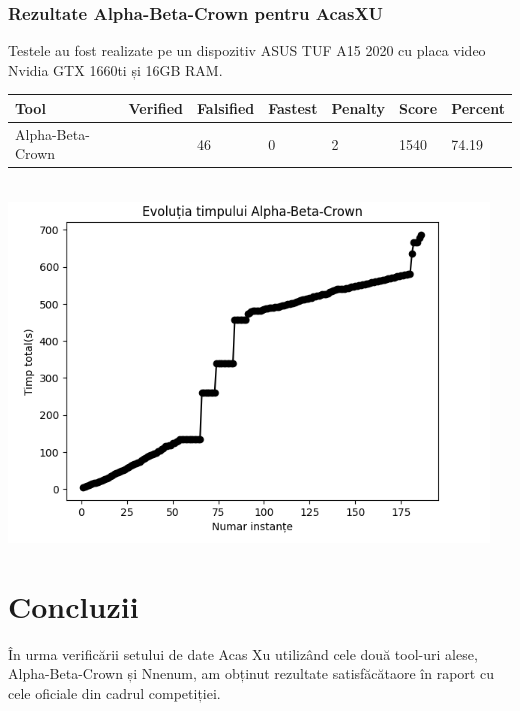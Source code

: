 \documentclass[12pt,a4paper]{article}
\begin{document}
\subsubsection{Rezultate Alpha-Beta-Crown pentru AcasXU}
Testele au fost realizate pe un dispozitiv ASUS TUF A15 2020 cu placa video Nvidia GTX 1660ti  și 16GB RAM.
\\
\begin{tabularx}{1.1\textwidth}{ | >{\centering\arraybackslash}X | >{\centering\arraybackslash}X | X | X | X | X | X | }
  \hline
   Tool & Verified & Falsified & Fastest & Penalty & Score & Percent \\
\hline
   Alpha-Beta-Crown & 138 & 46 & 0 & 2 & 1540 & 74.19 \\
\hline
\end{tabularx}
\\
\includegraphics[]{timp_ab.png}
\section{Concluzii}
În urma verificării setului de date Acas Xu utilizând cele două tool-uri alese, Alpha-Beta-Crown și Nnenum, am obținut
rezultate satisfăcătaore în raport cu cele oficiale din cadrul competiției.

\newpage


\end{document}
